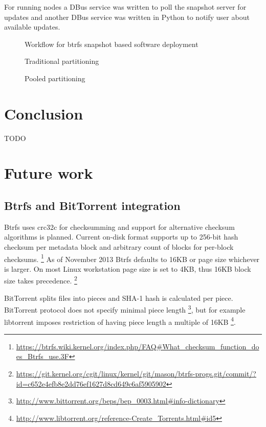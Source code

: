 \documentclass{article}
\begin{document}
For running nodes a DBus service was written to poll the snapshot server
for updates and another DBus service was written in Python to notify user
about available updates.

\begin{figure}[!htb]
\centering
\scalebox{0.5}{}
\caption{Workflow for btrfs snapshot based software deployment}
\label{fig:digraph}
\end{figure}

\begin{figure}[!htb]
\centering
\scalebox{0.5}{}
\caption{Traditional partitioning}
\label{fig:digraph}
\end{figure}

\begin{figure}[!htb]
\centering
\scalebox{0.5}{}
\caption{Pooled partitioning}
\label{fig:digraph}
\end{figure}


\section{Conclusion}

TODO


\section{Future work}

\subsection{Btrfs and BitTorrent integration}

Btrfs uses crc32c for checksumming and support for alternative checksum algorithms is planned.
Current on-disk format supports up to 256-bit hash checksum per
metadata block and arbitrary count of blocks for per-block checksums.
\footnote{\url{https://btrfs.wiki.kernel.org/index.php/FAQ#What_checksum_function_does_Btrfs_use.3F}}
As of November 2013 Btrfs defaults to 16KB or page size whichever
is larger.
On most Linux workstation page size is set to 4KB, thus 16KB block
size takes precedence.
\footnote{\url{https://git.kernel.org/cgit/linux/kernel/git/mason/btrfs-progs.git/commit/?id=c652e4efb8e2dd76ef1627d8cd649c6af5905902}}

BitTorrent splits files into pieces and SHA-1 hash is calculated per piece.
BitTorrent protocol does not specify minimal piece length
\footnote{\url{http://www.bittorrent.org/beps/bep_0003.html#info-dictionary}},
but for example libtorrent imposes restriction of having piece length
a multiple of 16KB
\footnote{\url{http://www.libtorrent.org/reference-Create_Torrents.html#id5}}.
\end{document}

